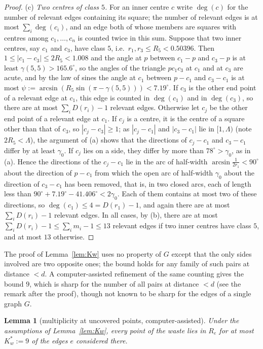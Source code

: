 \documentclass[11pt]{amsart}
\newtheorem{lemma}[theorem]{Lemma}
\theoremstyle{definition}
\theoremstyle{remark}
\begin{document}
\begin{proof}
(c) \emph{Two centres of class $5$.} For an inner centre $c$ write $\deg(c)$ for the number of relevant edges containing its square;
the number of relevant edges is at most $\sum_i\deg(c_i)$, and an edge both of whose members are squares with centres among
$c_1,\dots,c_n$ is counted twice in this sum. Suppose that two inner centres, say $c_1$ and $c_3$, have class $5$, i.e.\ $r_1,r_3\le R_5<0.50396$. Then
$1\le|c_1-c_3|\le2R_5<1.008$ and the angle at $p$ between $c_1-p$ and $c_3-p$ is at least $\gamma(5,5)>165.6^\circ$, so the angles of
the triangle $pc_1c_3$ at $c_1$ and at $c_3$ are acute, and by the law of sines the angle at $c_1$ between $p-c_1$ and $c_3-c_1$ is at
most $\psi:=\arcsin(R_5\sin(\pi-\gamma(5,5)))<7.19^\circ$. If $c_3$ is
the other end point of a relevant edge at $c_1$, this edge is counted in $\deg(c_1)$ and in $\deg(c_3)$, so there are at most
$\sum_iD(r_i)-1$ relevant edges. Otherwise let $c_j$ be the other end point of a relevant edge at $c_1$. If $c_j$ is a centre, it is
the centre of a square other than that of $c_3$, so $|c_j-c_3|\ge1$; as $|c_j-c_1|$ and $|c_3-c_1|$ lie in $[1,\Lambda)$ (note $2R_5<\Lambda$),
the argument of (a) shows that the directions of $c_j-c_1$ and $c_3-c_1$ differ by at least $\gamma_0$. If $c_j$ lies on a side, they
differ by more than $78^\circ>\gamma_0$, as in (a). Hence the directions of the $c_j-c_1$ lie in the arc of half-width
$\arcsin\frac1{2r_1}<90^\circ$ about the direction of $p-c_1$ from which the open arc of half-width $\gamma_0$ about the direction of
$c_3-c_1$ has been removed, that is, in two closed arcs, each of length less than $90^\circ+7.19^\circ-41.406^\circ<2\gamma_0$. Each of them
contains at most two of these directions, so $\deg(c_1)\le4=D(r_1)-1$, and again there are at most $\sum_iD(r_i)-1$ relevant
edges. In all cases, by (b), there are at most $\sum_iD(r_i)-1\le\sum_im_i-1\le13$ relevant edges if two inner centres have class
$5$, and at most $13$ otherwise.
\end{proof}

The proof of Lemma~\ref{lem:Kw} uses no property of $G$ except that the only sides involved are two opposite ones; the bound
holds for any family of such pairs at distance $<d$. A computer-assisted refinement of the same counting gives the bound $9$, which
is sharp for the number of all pairs at distance $<d$ (see the remark after the proof), though not known to be sharp for the edges
of a single graph $G$.

\begin{lemma}[multiplicity at uncovered points, computer-assisted]\label{lem:Kw9}
Under the assumptions of Lemma~\ref{lem:Kw}, every point of the waste lies in $R_e$ for at most $K_w^*:=9$ of the edges $e$
considered there.
\end{lemma}
\end{document}
